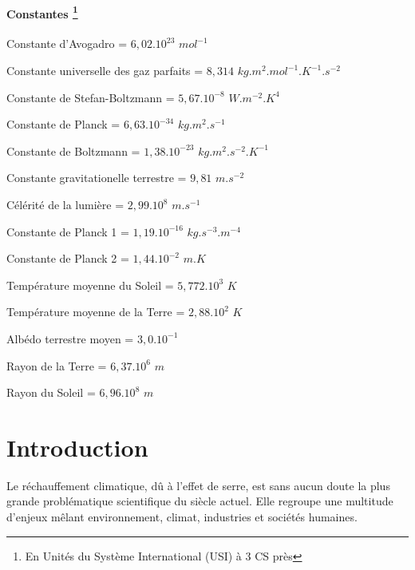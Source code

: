 \documentclass[a4paper, 12pt]{report} %
\begin{document}
\begin{description}
    \subsubsection*{Constantes \footnote{En Unités du Système International (USI) à 3 CS près}}
    \item[\boldmath{$N_A$}:] Constante d'Avogadro = $6,02.10^{23}$ $mol^{-1}$
	\item[\boldmath{$R$}:] Constante universelle des gaz parfaits = $8,314$ $kg.m^2.mol^{-1}.K^{-1}.s^{-2}$
	\item[\boldmath{$\sigma$}:] Constante de Stefan-Boltzmann = $5,67.10^{-8}$ $W.m^{-2}.K^{4}$
	\item[\boldmath{$h$}:] Constante de Planck = $6,63.10^{-34}$ $kg.m^2.s^{-1}$
 	\item[\boldmath{$k_B$}:] Constante de Boltzmann = $1,38.10^{-23}$ $kg.m^2.s^{-2}.K^{-1}$
  	\item[\boldmath{$g$}:] Constante gravitationelle terrestre = $9,81$ $m.s^{-2}$
   \item[\boldmath{$c_0$}:] Célérité de la lumière = $2,99.10^8$ $m.s^{-1}$
    \item[\boldmath{$C_1$}:] Constante de Planck 1 = $1,19.10^{-16}$ $kg.s^{-3}.m^{-4}$
    \item[\boldmath{$C_2$}:] Constante de Planck 2 = $1,44.10^{-2}$ $m.K$
    \item[\boldmath{$T_s$}:] Température moyenne du Soleil = $5,772.10^3$ $K$
    \item[\boldmath{$T_T$}:] Température moyenne de la Terre = $2,88.10^2$ $K$
    \item[\boldmath{$\bar{a_T}$}:] Albédo terrestre moyen = $3,0.10^{-1}$
    \item[\boldmath{$R_T$}:] Rayon de la Terre = $6,37.10^6$ $m$
    \item[\boldmath{$R_S$}:] Rayon du Soleil = $6,96.10^8$ $m$

\end{description}


\newpage
{}
\setcounter{page}{1}

\chapter*{Introduction}				

\indent Le réchauffement climatique, dû à l'effet de serre, est sans aucun doute la plus grande problématique 
scientifique du siècle actuel. Elle regroupe une multitude d'enjeux mêlant environnement,
climat, industries et sociétés humaines. \vspace{\baselineskip}
\end{document}
